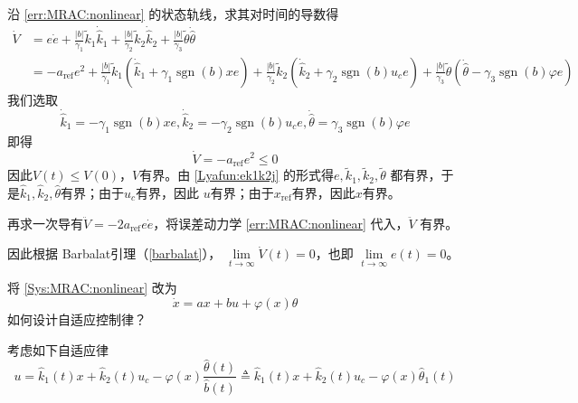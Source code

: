 沿 \eqref{err:MRAC:nonlinear} 的状态轨线，求其对时间的导数得
\begin{align*}
  \dot{V} & =  e  \dot{e} + \frac{| b |}{\gamma_1} \widetilde{ k} _1
  \dot{\hat{k}} _1 + \frac{| b |}{\gamma_2} \tilde{k} _2 \dot{\hat{k}} _2 +
  \frac{| b |}{\gamma_3} \tilde{\theta}  \dot{\hat{\theta}}\\
  & =  - a_{\ensuremath{\operatorname{ref}}} e^2 + \frac{| b |}{\gamma_1}
  \widetilde{ k} _1 (\dot{\hat{k}}_1 + \gamma_1
  \ensuremath{\operatorname{sgn}} (b) x  e) + \frac{| b |}{\gamma_2} \tilde{k}
  _2 (\dot{\hat{k}}_2 + \gamma_2 \ensuremath{\operatorname{sgn}} (b)  u_c e) +
  \frac{| b |}{\gamma_3} \tilde{\theta} (\dot{\hat{\theta}} - \gamma_3
  \ensuremath{\operatorname{sgn}} (b)   \varphi e)
\end{align*}
我们选取
\begin{equation*}
  \dot{\hat{k}}_1 = -  \gamma_1 \ensuremath{\operatorname{sgn}} (b) x  e,
  \dot{\hat{k}}_2 = -  \gamma_2 \ensuremath{\operatorname{sgn}} (b)  u_c e,
  \dot{\hat{\theta}} = \gamma_3 \ensuremath{\operatorname{sgn}} (b)   \varphi e
\end{equation*}
即得
\begin{equation*}
  \dot{V} = - a_{\ensuremath{\operatorname{ref}}} e^2 \leq 0
\end{equation*}
因此$V (t) \leq V (0)$，$V$有界。由 \eqref{Lyafun:ek1k2j} 的形式得$e, \tilde{k} _1,
\tilde{k} _2, \tilde{\theta}$ 都有界，于是$\hat{k}_1,\hat{k}_2,\hat{\theta}$有界；由于$u_c$有界，因此 $u$有界；由于$x_\mathrm{ref}$有界，因此$x$有界。

再求一次导有$ \ddot{V} = - 2 a_{\ensuremath{\operatorname{ref}}} e  \dot{e} $，将误差动力学 \eqref{err:MRAC:nonlinear} 代入，$\ddot{V}$ 有界。

因此根据 Barbalat引理（\ref{barbalat}）， $\lim\limits_{t \rightarrow \infty}
\dot{V} (t) = 0$，也即 $\lim\limits_{t \rightarrow \infty} e (t) = 0$。

\begin{problem}\label{Pro:scalar_with_uncertainty}
将 \eqref{Sys:MRAC:nonlinear} 改为
  \[ \dot{x} = a  x + b  u + \varphi(x) \theta \]
如何设计自适应控制律？
\end{problem}
\begin{hint}
考虑如下自适应律
\[ u = \hat{k}_1 (t) x + \hat{k}_2 (t) u_c - \varphi (x)
       \frac{\hat{\theta} (t)}{\hat{b} (t)} \triangleq \hat{k}_1 (t) x +
       \hat{k}_2 (t) u_c - \varphi (x) \hat{\theta}_1 (t) \]
\end{hint}


